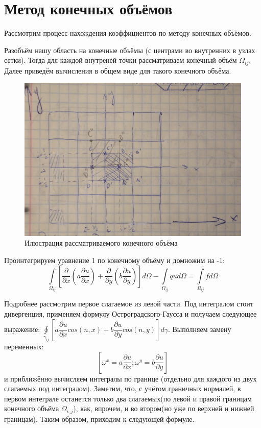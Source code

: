 \documentclass[12pt]{article}
\begin{document}
\section{Метод конечных объёмов}

Рассмотрим  процесс нахождения коэффициентов по методу конечных объёмов.

Разобъём нашу область на конечные объёмы (с центрами во внутренних в узлах сетки). Тогда для каждой внутреней точки рассматриваем конечный объём $\Omega_{ij}$. Далее приведём вычисления в общем виде для такого конечного объёма.

\begin{figure}[H] \label{fig1}
\centerline{\includegraphics[scale = 0.2]{image.jpg}}
\caption{Илюстрация рассматриваемого конечного объёма}
\end{figure} 

Проинтегрируем уравнение 1 по конечному объёму и домножим на -1:
\begin{equation}
\int\limits_{\Omega_{ij}}{\left[ \dfrac{\partial}{\partial x}\left( a\dfrac{\partial u}{\partial x}\right) + \dfrac{\partial}{\partial y}\left( b\dfrac{\partial u}{\partial y}\right) \right]d\Omega}
 - \int\limits_{\Omega_{ij}}qud\Omega = \int\limits_{\Omega_{ij}}fd\Omega 
\end{equation}

Подробнее рассмотрим первое слагаемое из левой части. Под интегралом стоит дивергенция, применяем формулу Остроградского-Гаусса и получаем следующее выражение:
$\oint\limits_{\gamma_{ij}}{\left[ a\dfrac{\partial u}{\partial x}cos(n,x) + b\dfrac{\partial u}{\partial y}cos(n,y) \right]d\gamma}$.
Выполняем замену переменных: 
\begin{equation}\label{eq4}
\left[ \omega^x = a\dfrac{\partial u}{\partial x}; \omega^y =  b\dfrac{\partial u}{\partial y} \right]
\end{equation}
и приближённо вычисляем интегралы по границе (отдельно для каждого из двух слагаемых под интегралом). Заметим, что, с учётом граничных нормалей, в первом интеграле останется только два слагаемых(по левой и правой границам конечного объёма $\Omega_{i,j}$), как, впрочем, и во втором(но уже по верхней и нижней границам). Таким образом, приходим к следующей формуле.
 
\end{document}

